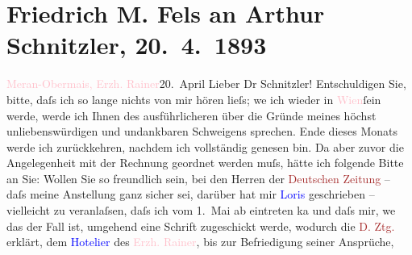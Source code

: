 

               \section[Friedrich M. Fels an Arthur Schnitzler, 20. 4. 1893]{ Friedrich M. Fels an Arthur Schnitzler, 20. 4. 1893}\nopagebreak{}\rehead{ }\normalsize\beginnumbering{} \toendnotes[C]{\smallbreak\pagebreak[2]} 
\toendnotes[C]{\smallbreak}\pstart
           \raggedleft{}{\pb}\textcolor{pink}{Meran-Obermais, Erzh. Rainer}{}\ledrightnote{\textcolor{pink}{Erzherzog Rainer}}{\\}20. April \label{K_L00198_1v}\label{K_L00198_1h}\pend
           \pstart\center{}Lieber Dr Schnitzler!\pend\pstart
           Entschuldigen Sie, bitte, daſs ich so lange nichts von mir hören lieſs; we{\geminationn} ich wieder in \textcolor{pink}{Wien}{}\ledrightnote{\textcolor{pink}{Wien}}{ }ſein werde, werde ich Ihnen des
                    ausführlicheren über die Gründe meines höchst unliebenswürdigen und undankbaren
                    Schweigens sprechen. Ende dieses Monats werde ich zurückkehren, nachdem ich
                    vollständig genesen bin. Da aber zuvor die Angelegenheit mit der Rechnung
                    geordnet werden muſs, hätte ich folgende Bitte an Sie: Wollen Sie so freundlich
                    sein, bei den Herren der \textcolor{brown}{Deutschen Zeitung}{}\ledrightnote{\textcolor{brown}{Deutsche Zeitung}} –
                    daſs meine Anstellung ganz sicher sei, darüber hat mir \textcolor{blue}{Loris}{}\ledrightnote{\textcolor{blue}{Hugo von Hofmannsthal}} geschrieben – vielleicht zu veranlaſsen, daſs ich
                    vom 1. Mai ab eintreten ka{\geminationn} und  daſs mir, we{\geminationn}
                    das der Fall ist, umgehend eine Schrift zugeschickt werde, wodurch die \textcolor{brown}{D. Ztg.}{}\ledrightnote{\textcolor{brown}{Deutsche Zeitung}} erklärt, dem \textcolor{blue}{Hotelier}{} des \textcolor{pink}{Erzh. Rainer}{}\ledrightnote{\textcolor{pink}{Erzherzog Rainer}}, bis zur Befriedigung seiner Ansprüche,
